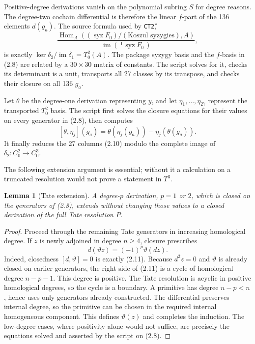 \documentclass[11pt]{article}
\newtheorem{lemma}[theorem]{Lemma}
\theoremstyle{definition}
\theoremstyle{remark}
\newcommand{\im}{\operatorname{im}}
\begin{document}
Positive-degree derivations vanish on the polynomial subring $S$ for degree
reasons.  The degree-two cochain differential is therefore the linear
$f$-part of the 136 elements $d(g_a)$.  The source formula used by
\texttt{CT\^2},
\[
 \frac{\operatorname{Hom}_A((\operatorname{syz}F_0)/
        (\text{Koszul syzygies}),A)}
      {\im(\,{}^{\mathsf T}\!\operatorname{syz}F_0\,)},         \tag{2.9}
\]
is exactly $\ker\delta_2/\im\delta_1=T^2_0(A)$.  The package syzygy basis
and the $f$-basis in (2.8) are related by a $30\times30$ matrix of constants.
The script solves for it, checks its determinant is a unit, transports all 27
classes by its transpose, and checks their closure on all 136 $g_a$.

Let $\theta$ be the degree-one derivation representing $y$, and let
$\eta_1,\ldots,\eta_{27}$ represent the transported $T^2_0$ basis.  The
script first solves the closure equations for their values on every generator
in (2.8), then computes
\[
 [\theta,\eta_j](g_a)=
 \theta(\eta_j(g_a))-\eta_j(\theta(g_a)).                       \tag{2.10}
\]
It finally reduces the 27 columns (2.10) modulo the complete image of
$\delta_2:C^2_0\to C^3_0$.

The following extension argument is essential; without it a calculation on a
truncated resolution would not prove a statement in $T^3$.

\begin{lemma}[Tate extension]\label{lem:tate}
A degree-$p$ derivation, $p=1$ or $2$, which is closed on the generators of
(2.8), extends without changing those values to a closed derivation of the
full Tate resolution $P$.
\end{lemma}

\begin{proof}
Proceed through the remaining Tate generators in increasing homological
degree.  If $z$ is newly adjoined in degree $n\ge4$, closure prescribes
\[
 d(\vartheta z)=(-1)^p\vartheta(dz).                            \tag{2.11}
\]
Indeed, closedness $[d,\vartheta]=0$ is exactly (2.11).  Because $d^2z=0$ and
$\vartheta$ is already closed on earlier generators, the right side of
(2.11) is a cycle of homological degree $n-p-1$.  This degree is positive.
The Tate resolution is acyclic in positive homological degrees, so the cycle
is a boundary.  A primitive has degree $n-p<n$, hence uses only generators
already constructed.  The differential preserves internal degree, so the
primitive can be chosen in the required internal homogeneous component.
This defines $\vartheta(z)$ and completes the induction.  The low-degree
cases, where positivity alone would not suffice, are precisely the equations
solved and asserted by the script on (2.8).
\end{proof}
\end{document}
